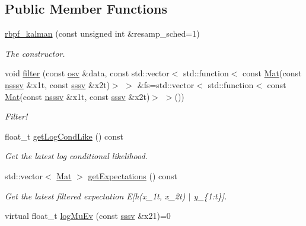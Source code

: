 \subsection*{Public Member Functions}
\begin{DoxyCompactItemize}
\item 
\hyperlink{classrbpf__kalman_a1e128a8dce0874251839b88d1f3cf123}{rbpf\+\_\+kalman} (const unsigned int \&resamp\+\_\+sched=1)
\begin{DoxyCompactList}\small\item\em The constructor. \end{DoxyCompactList}\item 
void \hyperlink{classrbpf__kalman_aad12bf3b1966d7201922770b90429bf0}{filter} (const \hyperlink{classrbpf__kalman_ae6e59c034c1b0abc7871887ae088055e}{osv} \&data, const std\+::vector$<$ std\+::function$<$ const \hyperlink{classrbpf__kalman_a736704f31949e04f537aa8b7263e44af}{Mat}(const \hyperlink{classrbpf__kalman_aea6e6dd087b2fca63be4e480dcf0d1c3}{nsssv} \&x1t, const \hyperlink{classrbpf__kalman_a616e56c08c1a6b476e065b2200433915}{sssv} \&x2t)$>$ $>$ \&fs=std\+::vector$<$ std\+::function$<$ const \hyperlink{classrbpf__kalman_a736704f31949e04f537aa8b7263e44af}{Mat}(const \hyperlink{classrbpf__kalman_aea6e6dd087b2fca63be4e480dcf0d1c3}{nsssv} \&x1t, const \hyperlink{classrbpf__kalman_a616e56c08c1a6b476e065b2200433915}{sssv} \&x2t)$>$ $>$())
\begin{DoxyCompactList}\small\item\em Filter! \end{DoxyCompactList}\item 
float\+\_\+t \hyperlink{classrbpf__kalman_a90d76b85bf97e0f774788e5ccc3aaf8b}{get\+Log\+Cond\+Like} () const
\begin{DoxyCompactList}\small\item\em Get the latest log conditional likelihood. \end{DoxyCompactList}\item 
std\+::vector$<$ \hyperlink{classrbpf__kalman_a736704f31949e04f537aa8b7263e44af}{Mat} $>$ \hyperlink{classrbpf__kalman_a14b715a91d8b8f8bd24946dacc449b18}{get\+Expectations} () const
\begin{DoxyCompactList}\small\item\em Get the latest filtered expectation E\mbox{[}h(x\+\_\+1t, x\+\_\+2t) $\vert$ y\+\_\+\{1\+:t\}\mbox{]}. \end{DoxyCompactList}\item 
virtual float\+\_\+t \hyperlink{classrbpf__kalman_a7040efe459b2346aa8c06a3013f3887c}{log\+Mu\+Ev} (const \hyperlink{classrbpf__kalman_a616e56c08c1a6b476e065b2200433915}{sssv} \&x21)=0

\end{DoxyCompactItemize}
